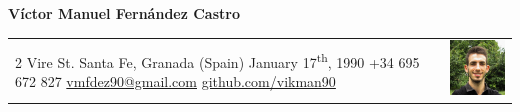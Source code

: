\documentclass[12pt,a4paper]{article}
\begin{document}
	\sffamily
	\large

	\begin{center}
		\textbf{Víctor Manuel Fernández Castro}
	\end{center}

	\normalsize
	\centering

	\begin{tabular}{m{}m{}}
		2 Vire St. \newline
		Santa Fe, Granada (Spain) \newline
		January 17\textsuperscript{th}, 1990 \newline
		\newline
		+34 695 672 827 \newline
		\href{mailto:vmfdez90@gmail.com}{vmfdez90@gmail.com} \newline
		\href{https://github.com/vikman90}{github.com/vikman90} &
		\includegraphics[width=3cm]{victor}
	\end{tabular}

	\medskip

\end{document}
